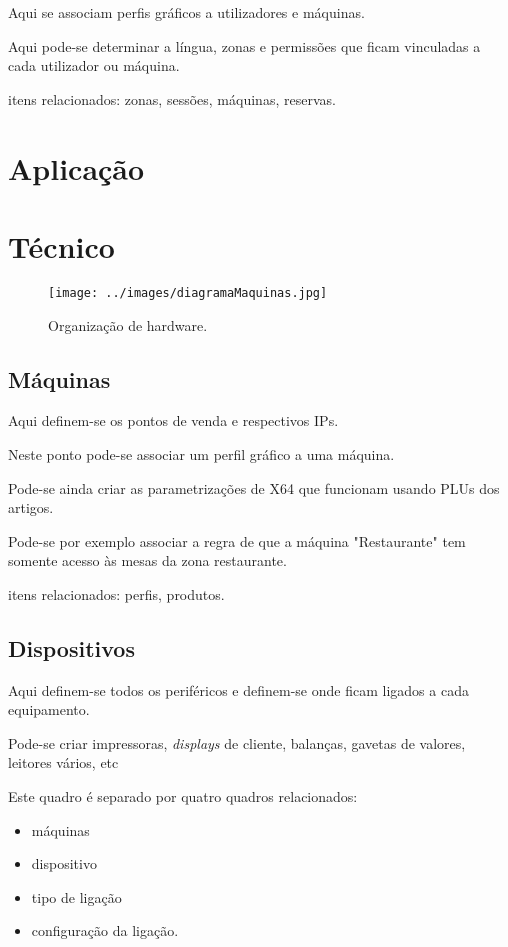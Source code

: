 \documentclass[a4paper,11pt,openany]{memoir}
\begin{document}
Aqui se associam perfis gráficos a utilizadores e máquinas.

Aqui pode-se determinar a língua, zonas e permissões que ficam vinculadas a cada utilizador ou máquina.

itens relacionados: zonas, sessões, máquinas, reservas.

\chapter{Aplicação}

\chapter{Técnico}

\begin{figure}
\texttt{[image: ../images/diagramaMaquinas.jpg]}
\caption[Submanifold]{Organização de hardware.}
\end{figure}

\section{Máquinas}

Aqui definem-se os pontos de venda  e respectivos IPs.

Neste ponto pode-se associar um perfil gráfico a uma máquina.

Pode-se ainda criar as parametrizações de X64 que funcionam usando PLUs dos artigos.

Pode-se por exemplo associar a regra de que a máquina "Restaurante" tem somente acesso às mesas da zona restaurante. 

itens relacionados: perfis, produtos.

\section{Dispositivos}

Aqui definem-se todos os periféricos e definem-se onde ficam ligados a cada equipamento.

Pode-se criar impressoras, \emph{displays} de cliente, balanças, gavetas de valores, leitores vários, etc

Este quadro é separado por quatro quadros relacionados: 
\begin{itemize}
\item máquinas
\item dispositivo
\item tipo de ligação
\item configuração da ligação.
\end{itemize}
\end{document}
